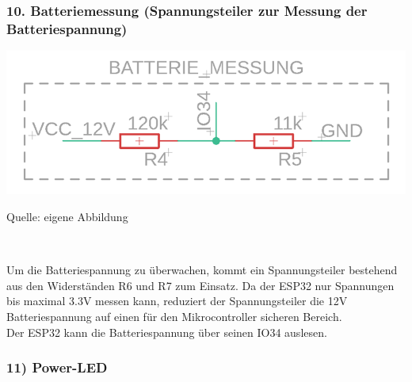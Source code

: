\documentclass[ngerman,12pt,a4paper]{article}
\begin{document}
		\subsubsection*{10. Batteriemessung (Spannungsteiler zur Messung der Batteriespannung)}
		
		\begin{center} 
			\begin{minipage}[t]{\textwidth}
				\includegraphics{Pictures/Batteriemessung}
				\label{fig: Batteriemessung}
				\vspace{-10pt}
				\begin{center}
					\par\small Quelle: eigene Abbildung
				\end{center}
			\end{minipage} \\[0.75cm]
		\end{center}
		Um die Batteriespannung zu überwachen, kommt ein Spannungsteiler bestehend aus den Widerständen R6 und R7 zum Einsatz. Da der ESP32 nur Spannungen bis maximal 3.3V messen kann, reduziert der Spannungsteiler die 12V Batteriespannung auf einen für den Mikrocontroller sicheren Bereich. \\[0.5cm]
		Der ESP32 kann die Batteriespannung über seinen IO34 auslesen.
		
		\subsubsection*{	11) Power-LED}
		
\end{document}
